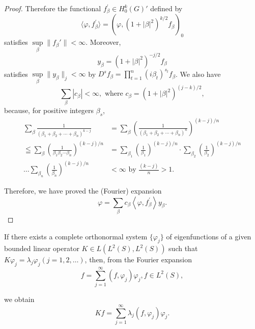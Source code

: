 \begin{proof}
Therefore the functional $f_{\beta}^{\prime} \in H_0^k (G)'$ defined by 
\[
\langle \varphi , f _{\beta} ^{\prime} \rangle = (\varphi , (1 + | \beta | ^{2}) ^{k/2} f _{\beta}) _{0}
\]
satisfies $\sup\limits_{\beta}\|f_{\beta}'\| < \infty$. Moreover, 
\[
y _{\beta} = (1 + | \beta | ^{2}) ^{-j/2} f _{\beta}
\]
satisfies $\sup\limits_{\beta}\|y_{\beta}\|_j < \infty$ by $D^{s}f_{\beta} = \prod\limits_{t=1}^{n}(i\beta_{t})^{s_{t}}f_{\beta}$. We also have 
\[
\sum\limits_{\beta} | c _{\beta} | < \infty , \text{ where } c _{\beta} = (1 + | \beta | ^{2}) ^{(j-k)/2},
\]
because, for positive integers $\beta_{s}$, 
\[
\begin{aligned}
\sum\limits_{\beta} \frac {1}{(\beta_{1} + \beta_{2} + \cdots + \beta_{n}) ^{k-j}} &= \sum\limits_{\beta} \left(\frac {1}{(\beta_{1} + \beta_{2} + \cdots + \beta_{n}) ^{n}}\right) ^{(k-j)/n}
\\
\leqq \sum\limits_{\beta} \left(\frac {1}{\beta_{1} \beta_{2} \cdots \beta_{n}}\right) ^{(k-j)/n} &= \sum\limits_ {\beta_{1}} \left(\frac {1}{\beta_{1}}\right) ^{(k-j)/n} \cdot \sum\limits_ {\beta_{2}} \left(\frac {1}{\beta_{2}}\right) ^{(k-j)/n}
\\
\dots \sum\limits_ {\beta_{n}} \left(\frac {1}{\beta_{n}}\right) ^{(k-j)/n}& < \infty \text{ by } \frac {(k - j)}{n} > 1.
\end{aligned}
\]

Therefore, we have proved the (Fourier) expansion 
\[
\varphi = \sum\limits_{\beta} c _{\beta} \left< \varphi , f _{\beta} ^{\prime} \right> y _{\beta}.
\]
\end{proof}

\begin{remarku} If there exists a complete orthonormal system $\{\varphi_{j}\}$ of eigenfunctions of a given bounded linear operator $K \in L(L^{2}(S), L^{2}(S))$ such that $K\varphi_{j} = \lambda_{j}\varphi_{j} (j = 1, 2, \ldots)$, then, from the Fourier expansion 
\[
f = \sum\limits_{j=1} ^{\infty} (f, \varphi_{j}) \varphi_{j}, f \in L ^{2} (S),
\]
\end{remarku}

we obtain 
\[
K f = \sum\limits_{j=1} ^{\infty} \lambda_{j} (f, \varphi_{j}) \varphi_{j}.
\]

